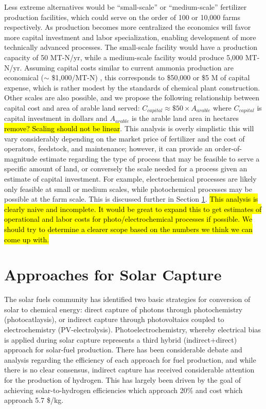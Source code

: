 Less extreme alternatives would be ``small-scale'' or ``medium-scale'' fertilizer production facilities, which could serve on the order of 100 or 10,000 farms respectively. As production becomes more centralized the economics will favor more capital investment and labor specialization, enabling development of more technically advanced processes. The small-scale facility would have a production capacity of 50 MT-N/yr, while a medium-scale facility would produce 5,000 MT-N/yr. Assuming capital costs similar to current ammonia production are economical ($\sim$ \$1,000/MT-N) \needcite, this corresponds to \$50,000 or \$5 M of capital expense, which is rather modest by the standards of chemical plant construction. Other scales are also possible, and we propose the following relationship between capital cost and area of arable land served: $C_{capital} \approx \$ 50 \times A_{arable}$ where $C_{capital}$ is capital investment in dollars and $A_{arable}$ is the arable land area in hectares \hl{remove? Scaling should not be linear}. This analysis is overly simplistic this will vary considerably depending on the market price of fertilizer and the cost of operators, feedstock, and maintenance; however, it can provide an order-of-magnitude estimate regarding the type of process that may be feasible to serve a specific amount of land, or conversely the scale needed for a process given an estimate of capital investment. For example, electrochemical processes are likely only feasible at small or medium scales, while photochemical processes may be possible at the farm scale. This is discussed further in Section \ref{sec:approaches}. \hl{This analysis is clearly naive and incomplete. It would be great to expand this to get estimates of operational and labor costs for photo/electrochemical processes if possible. We should try to determine a clearer scope based on the numbers we think we can come up with.}



\section{Approaches for Solar Capture}
\label{sec:approaches}

The solar fuels community has identified two basic strategies for conversion of solar to chemical energy: direct capture of photons through photochemistry (photocatlaysis), or indirect capture through photovoltaics coupled to electrochemistry (PV-electrolysis)\cite{McDaniel_2010,Highfield_2015}. Photoelectrochemistry, whereby electrical bias is applied during solar capture represents a third hybrid (indirect+direct) approach for solar-fuel production. There has been considerable debate and analysis regarding the efficiency of each approach for fuel production\cite{Montoya_2017,Daviseaas9793,Lewis_2016,Herron_2015}, and while there is no clear consensus, indirect capture has received considerable attention for the production of hydrogen. This has largely been driven by the goal of achieving solar-to-hydrogen efficiencies which approach 20\% and cost which approach 5.7 \$/kg. 

